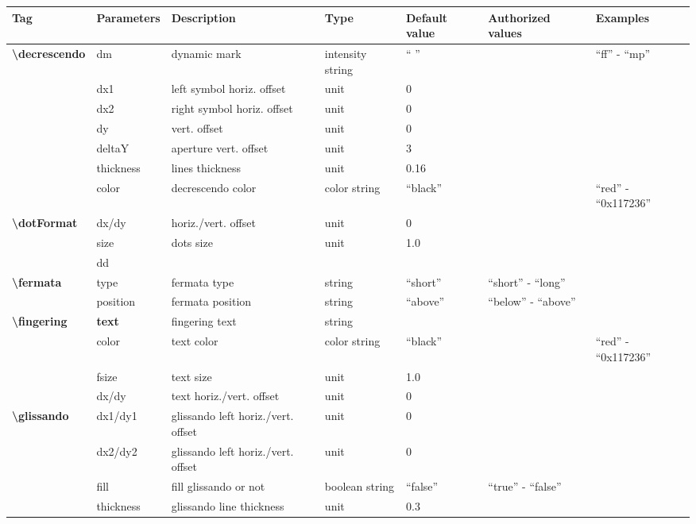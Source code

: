 \documentclass[a4paper, landscape, 10pt]{article}
\begin{document}
\begin{tabularx}{\linewidth}{p{3cm}p{2cm}p{5cm}p{3cm}p{3.5cm}p{3.5cm}p{4cm}}
    \hline
    \textbf{Tag}&\textbf{Parameters}&\textbf{Description}&\textbf{Type}&\textbf{Default value}&\textbf{Authorized values}&\textbf{Examples}\\
    \hline
    \textbf{\textbackslash{}decrescendo}&dm&dynamic mark&intensity string&`` ''&&``ff'' - ``mp''\\
    &dx1&left symbol horiz. offset&unit&0&&\\
    &dx2&right symbol horiz. offset&unit&0&&\\
    &dy&vert. offset&unit&0&&\\
    &deltaY&aperture vert. offset&unit&3&&\\
    &thickness&lines thickness&unit&0.16&&\\
    &color&decrescendo color&color string&``black''&&``red'' - ``0x117236''\\
    \hline    
    \textbf{\textbackslash{}dotFormat}&dx/dy&horiz./vert. offset&unit&0&&\\
    &size&dots size&unit&1.0&&\\
    &dd&&&&&\\ %
    \hline
    \textbf{\textbackslash{}fermata}&type&fermata type&string&``short''&``short'' - ``long''&\\
    &position&fermata position&string&``above''&``below'' - ``above''&\\
    \hline
    \textbf{\textbackslash{}fingering}&\textbf{text}&fingering text&string&&&\\
    &color&text color&color string&``black''&&``red'' - ``0x117236''\\
    &fsize&text size&unit&1.0&&\\
    &dx/dy&text horiz./vert. offset&unit&0&&\\
    \hline
    \textbf{\textbackslash{}glissando}&dx1/dy1&glissando left horiz./vert. offset&unit&0&&\\
    &dx2/dy2&glissando left horiz./vert. offset&unit&0&&\\
    &fill&fill glissando or not&boolean string&``false''&``true'' - ``false''&\\
    &thickness&glissando line thickness&unit&0.3&&\\

\end{tabularx}
\end{document}
